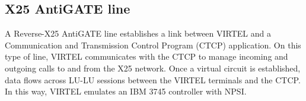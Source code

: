 \documentclass[letterpaper,10pt,english]{sphinxmanual}
\begin{document}
\begin{sphinxVerbatim}[commandchars=\\\{\}]
                     
                                     
                
                                      
                                       
                                       
                                         
    
\end{sphinxVerbatim}



\subsection{X25 AntiGATE line}
\label{\detokenize{connectivity_guide:x25-antigate-line}}
A Reverse-X25 AntiGATE line establishes a link between VIRTEL and a Communication and Transmission Control Program (CTCP) application. On this type of line, VIRTEL communicates with the CTCP to manage incoming and outgoing calls to and from the X25 network. Once a virtual circuit is established, data flows across LU-LU sessions between the VIRTEL terminals and the CTCP. In this way, VIRTEL emulates an IBM 3745 controller with NPSI.

\end{document}
